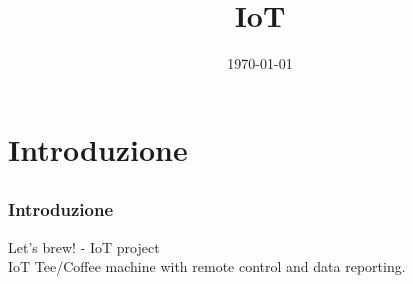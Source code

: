 \documentclass[12pt]{beamer}
\title[Short title]{IoT} %
\author{} %
\institute[Sapienza] %
{
La Sapienza \\ %
\medskip
\textit{studenti.uniroma1.it} %

}
\date{\today} %
\begin{document}







{ %
    \begin{frame}[plain]
     \end{frame}
}


\section{Introduzione}




\subsection{}
\begin{frame}
    \frametitle{Introduzione}
Let's brew! - IoT project\\
IoT Tee/Coffee machine with remote control and data reporting.
\end{frame}
\end{document}
